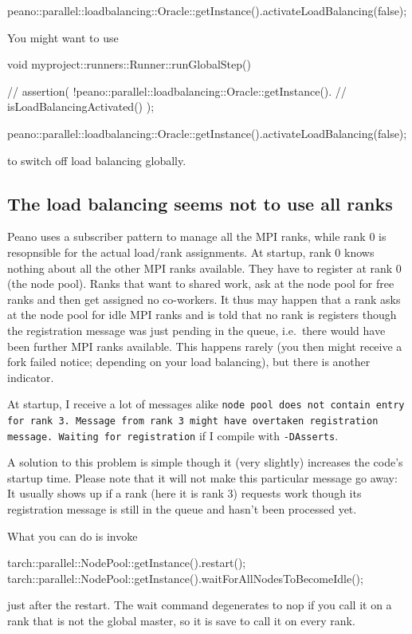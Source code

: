 \begin{code}
peano::parallel::loadbalancing::Oracle::getInstance().activateLoadBalancing(false);
\end{code}


You might want to use
\begin{code}
void myproject::runners::Runner::runGlobalStep() {
  // assertion( !peano::parallel::loadbalancing::Oracle::getInstance().
  // isLoadBalancingActivated() );

  peano::parallel::loadbalancing::Oracle::getInstance().activateLoadBalancing(false);
}
\end{code}

\noindent
to switch off load balancing globally.



\subsection{The load balancing seems not to use all ranks}

\noindent
Peano uses a subscriber pattern to manage all the MPI ranks, while rank 0 is
resopnsible for the actual load/rank assignments.
At startup, rank 0 knows nothing about all the other MPI ranks available.
They have to register at rank 0 (the node pool).
Ranks that want to shared work, ask at the node pool for free ranks and then get
assigned no co-workers.
It thus may happen that a rank asks at the node pool for idle MPI ranks and is
told that no rank is registers though the registration message was just pending
in the queue, i.e.~there would have been further MPI ranks available.
This happens rarely (you then might receive a fork failed notice; depending on
your load balancing), but there is another indicator.

\begin{smell}
  At startup, I receive a lot of messages alike \texttt{node pool does not
  contain entry for rank 3. Message from rank 3 might have overtaken
  registration message. Waiting for registration} if I compile with
  \texttt{-DAsserts}.
\end{smell}

\noindent
A solution to this problem is simple though it (very slightly) increases the
code's startup time.
Please note that it will not make this particular message go away:  
It usually shows up if a rank (here it is rank 3) requests work though its
registration message is still in the queue and hasn't been processed yet.

What you can do is invoke 
\begin{code}
  tarch::parallel::NodePool::getInstance().restart();
  tarch::parallel::NodePool::getInstance().waitForAllNodesToBecomeIdle();
\end{code}
\noindent
just after the restart.
The wait command degenerates to nop if you call it on a rank that is not the
global master, so it is save to call it on every rank.
